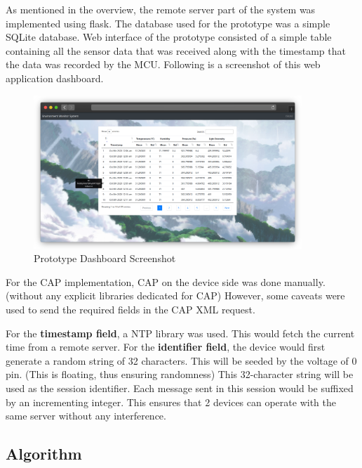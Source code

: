 \documentclass[12pt,a4paper]{article}
\begin{document}
As mentioned in the overview, the remote server part of the system was implemented using flask.
The database used for the prototype was a simple SQLite database.
Web interface of the prototype consisted of a simple table containing all the
sensor data that was received along with the timestamp that the data was recorded by the MCU.
Following is a screenshot of this web application dashboard.

\begin{figure}[H]
    \centering
    \includegraphics[width=0.9\textwidth]{./images/browser.png}
    \caption{Prototype Dashboard Screenshot}
\end{figure}

For the CAP implementation, CAP on the device side was done manually. (without any explicit libraries dedicated for CAP)
However, some caveats were used to send the required fields in the CAP XML request.

For the \textbf{timestamp field}, a NTP library was used. This would fetch the current time from a remote server.
For the \textbf{identifier field}, the device would first generate a random string of 32 characters.
This will be seeded by the voltage of 0 pin. (This is floating, thus ensuring randomness)
This 32-character string will be used as the session identifier.
Each message sent in this session would be suffixed by an incrementing integer.
This ensures that 2 devices can operate with the same server without any interference.

\newpage


\subsection{Algorithm}
\end{document}
